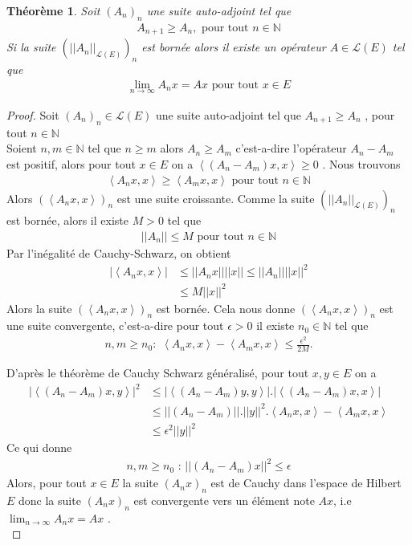 \documentclass{report}
\newtheorem{The}{Théorème}[subsection]
\begin{document}
{\begin{The} Soit $(A_n)_n$ une suite auto-adjoint tel que 
					\begin{align*}
					 A_{n+1} \ge A_n , \,\,\text{pour tout}\,\, n \in \mathbb{N}
					\end{align*}
Si la suite $(||A_n||_{\mathscr{L}(E)})_n$ est bornée alors il existe un opérateur $A \in \mathscr{L}(E)$ tel que
					\begin{align*}
					 \lim_{n\to \infty} A_n x = A x \,\,\text{pour tout}\,\, x \in E 
					\end{align*}
\end{The}
\begin{proof}
Soit $(A_n)_n \in \mathscr{L}(E)$ une suite auto-adjoint tel que $A_{n+1} \ge A_n$ , pour tout $n \in \mathbb{N}$ \\
Soient $n,m \in \mathbb{N}$ tel que $n \ge m$ alors $A_n \ge A_m$ c'est-a-dire l'opérateur $A_n - A_m$ est positif, alors pour tout $x \in E$ on a $\left< (A_n - A_m)x,x \right> \ge 0$ . Nous trouvons 
					\begin{align*}
					 \left<  A_nx,x \right> \ge \left< A_mx,x \right> \,\,\text{pour tout}\,\, n \in \mathbb{N} 
					\end{align*}
Alors $(\left< A_nx,x \right>)_n$ est une suite croissante. Comme la suite $(||A_n||_{\mathscr{L}(E)})_n$ est bornée, alors il existe $M > 0$ tel que 
					\begin{align*}
					 ||A_n|| \le M  \,\,\text{pour tout}\,\, n \in \mathbb{N}
					\end{align*}
Par l'inégalité de Cauchy-Schwarz, on obtient 
					\begin{align*}
					 |\left< A_nx,x \right>| &\le ||A_nx|| ||x|| \le ||A_n|| ||x||^2 \\
					 &\le M ||x||^2
					\end{align*}
Alors la suite $(\left< A_nx,x \right>)_n$ est bornée. Cela nous donne $(\left< A_nx,x \right>)_n$ est une suite convergente, c'est-a-dire pour tout $\epsilon > 0$ il existe $n_0 \in \mathbb{N}$ tel que 
					\begin{align*}
					 n,m \ge n_0 : \,\, \left< A_nx,x \right> - \left< A_mx,x \right> \le \frac{\epsilon^2}{2M} .
					\end{align*}



D'après le théorème de Cauchy Schwarz généralisé, pour tout $x,y \in E$ on a 
					\begin{align*}
					 | \left< (A_n - A_m)x,y \right> |^2 &\le |\left< (A_n-A_m)y,y \right>|.|\left< (A_n-A_m)x,x \right>| \\
					 &\le ||(A_n-A_m)||.||y||^2.\left< A_nx,x \right> - \left< A_mx,x \right> \\
					 &\le \epsilon^2 ||y||^2
					\end{align*}
Ce qui donne 
					\begin{align*}
					 n,m \ge n_0 \,\,\text{:}\,\, ||(A_n - A_m)x||^2 \le \epsilon 
					\end{align*}
Alors, pour tout $x \in E$ la suite $(A_nx)_n$ est de Cauchy dans l'espace de Hilbert $E$ donc la suite $(A_nx)_n$ est convergente vers un élément note $Ax$, i.e $\lim_{n\to \infty} A_n x = Ax$ .\\


\end{proof}}
\end{document}
